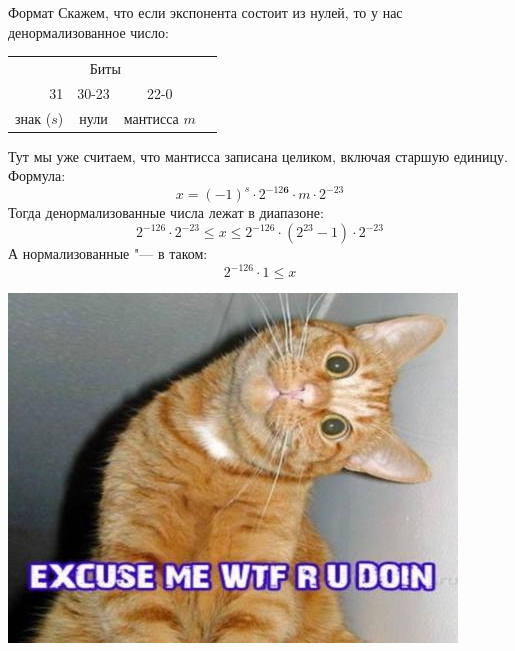 \begin{frame}{Формат}
	Скажем, что если экспонента состоит из нулей, то у нас денормализованное число:
	\begin{center}
		\begin{tabular}{r|c|c|c}
			\multicolumn{3}{c}{Биты} \\
			31 & 30-23 & 22-0 \\\hline
			знак ($s$) & нули & мантисса $m$ \\
		\end{tabular}
	\end{center}
	Тут мы уже считаем, что мантисса записана целиком, включая старшую единицу.
	Формула:
	\[
		x = (-1)^s \cdot 2^{-12\textbf{6}} \cdot m \cdot 2^{-23}
	\]
	Тогда денормализованные числа лежат в диапазоне:
	\[
		2^{-126} \cdot 2^{-23} \le x \le 2^{-126} \cdot (2^{23}-1) \cdot2^{-23}
	\]
	А нормализованные "--- в таком:
	\[
		2^{-126} \cdot 1 \le x
	\]
\end{frame}

\begin{frame}
	\begin{center}
		\includegraphics[scale=0.75]{what-are-you-doing.jpg}
	\end{center}
\end{frame}

